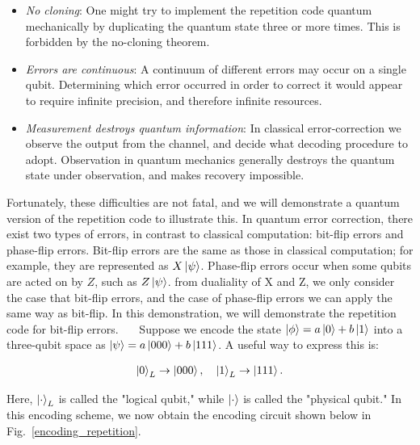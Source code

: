 \documentclass[a4paper,11pt]{ltjsarticle}
\begin{document}
{{{            \begin{itemize}
                \item \textit{No cloning}: One might try to implement the repetition code quantum mechanically by duplicating the quantum state three or more times. This is forbidden by the no-cloning theorem.
                \item \textit{Errors are continuous}: A continuum of different errors may occur on a single qubit.
                Determining which error occurred in order to correct it would appear to require infinite precision, and therefore infinite resources.
                \item \textit{Measurement destroys quantum information}: In classical error-correction we observe the output from the channel, and decide what decoding procedure to adopt. Observation in quantum mechanics generally destroys the quantum state under observation, and makes recovery impossible.
            \end{itemize}

            Fortunately, these difficulties are not fatal, and we will demonstrate a quantum version of the repetition code to illustrate this. In quantum error correction, there exist two types of errors, in contrast to classical computation: bit-flip errors and phase-flip errors. Bit-flip errors are the same as those in classical computation; for example, they are represented as $X\ket{\psi}$. Phase-flip errors occur when some qubits are acted on by $Z$, such as $Z\ket{\psi}$. from dualiality of X and Z, we only consider the case that bit-flip errors, and the case of phase-flip errors we can apply the same way as bit-flip. In this demonstration, we will demonstrate the repetition code for bit-flip errors. 
            \ \ \ Suppose we encode the state \(\ket{\phi} = a\ket{0} + b\ket{1}\) into a three-qubit space as \(\ket{\psi} = a\ket{000} + b\ket{111}\). A useful way to express this is:

            \begin{align}
                    \ket{0}_L \rightarrow \ket{000},\ \ \ \ket{1}_L \rightarrow \ket{111}.
            \end{align}

            Here, \(\ket{\cdot}_L\) is called the "logical qubit," while \(\ket{\cdot}\) is called the "physical qubit." In this encoding scheme, we now obtain the encoding circuit shown below in Fig.~\ref{encoding_repetition}.

}}}
\end{document}
